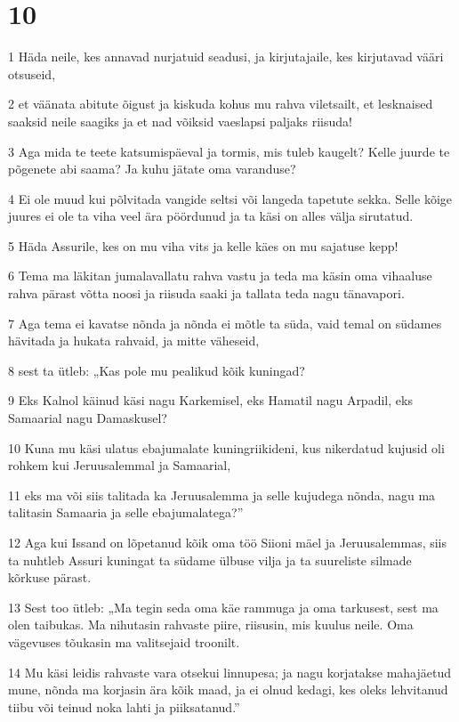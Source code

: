 \chapter{10}

\par 1 Häda neile, kes annavad nurjatuid seadusi, ja kirjutajaile, kes kirjutavad vääri otsuseid,
\par 2 et väänata abitute õigust ja kiskuda kohus mu rahva viletsailt, et lesknaised saaksid neile saagiks ja et nad võiksid vaeslapsi paljaks riisuda!
\par 3 Aga mida te teete katsumispäeval ja tormis, mis tuleb kaugelt? Kelle juurde te põgenete abi saama? Ja kuhu jätate oma varanduse?
\par 4 Ei ole muud kui põlvitada vangide seltsi või langeda tapetute sekka. Selle kõige juures ei ole ta viha veel ära pöördunud ja ta käsi on alles välja sirutatud.
\par 5 Häda Assurile, kes on mu viha vits ja kelle käes on mu sajatuse kepp!
\par 6 Tema ma läkitan jumalavallatu rahva vastu ja teda ma käsin oma vihaaluse rahva pärast võtta noosi ja riisuda saaki ja tallata teda nagu tänavapori.
\par 7 Aga tema ei kavatse nõnda ja nõnda ei mõtle ta süda, vaid temal on südames hävitada ja hukata rahvaid, ja mitte väheseid,
\par 8 sest ta ütleb: „Kas pole mu pealikud kõik kuningad?
\par 9 Eks Kalnol käinud käsi nagu Karkemisel, eks Hamatil nagu Arpadil, eks Samaarial nagu Damaskusel?
\par 10 Kuna mu käsi ulatus ebajumalate kuningriikideni, kus nikerdatud kujusid oli rohkem kui Jeruusalemmal ja Samaarial,
\par 11 eks ma või siis talitada ka Jeruusalemma ja selle kujudega nõnda, nagu ma talitasin Samaaria ja selle ebajumalatega?”
\par 12 Aga kui Issand on lõpetanud kõik oma töö Siioni mäel ja Jeruusalemmas, siis ta nuhtleb Assuri kuningat ta südame ülbuse vilja ja ta suureliste silmade kõrkuse pärast.
\par 13 Sest too ütleb: „Ma tegin seda oma käe rammuga ja oma tarkusest, sest ma olen taibukas. Ma nihutasin rahvaste piire, riisusin, mis kuulus neile. Oma vägevuses tõukasin ma valitsejaid troonilt.
\par 14 Mu käsi leidis rahvaste vara otsekui linnupesa; ja nagu korjatakse mahajäetud mune, nõnda ma korjasin ära kõik maad, ja ei olnud kedagi, kes oleks lehvitanud tiibu või teinud noka lahti ja piiksatanud.”
